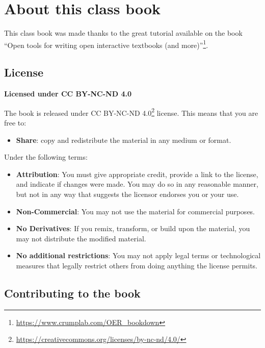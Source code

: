 \documentclass[
  12pt,
]{book}
\providecommand{\tightlist}{%
  \setlength{\itemsep}{0pt}\setlength{\parskip}{0pt}}
\DeclareRobustCommand{\href}[2]{#2\footnote{\url{#1}}}
\begin{document}
\section*{About this class book}\label{about-this-class-book}

This class book was made thanks to the great tutorial available on the book \href{https://www.crumplab.com/OER_bookdown}{``Open tools for writing open interactive textbooks (and more)''}.

\subsection*{License}\label{license}

\textbf{Licensed under CC BY-NC-ND 4.0}

The book is released under \href{https://creativecommons.org/licenses/by-nc-nd/4.0/}{CC BY-NC-ND 4.0} license. This means that you are free to:

\begin{itemize}
\tightlist
\item
  \textbf{Share}: copy and redistribute the material in any medium or format.
\end{itemize}

Under the following terms:

\begin{itemize}
\tightlist
\item
  \textbf{Attribution}: You must give appropriate credit, provide a link to the license, and indicate if changes were made. You may do so in any reasonable manner, but not in any way that suggests the licensor endorses you or your use.
\item
  \textbf{Non-Commercial}: You may not use the material for commercial purposes.
\item
  \textbf{No Derivatives}: If you remix, transform, or build upon the material, you may not distribute the modified material.
\item
  \textbf{No additional restrictions}: You may not apply legal terms or technological measures that legally restrict others from doing anything the license permits.
\end{itemize}

\subsection*{Contributing to the book}\label{contributing-to-the-book}
\end{document}
